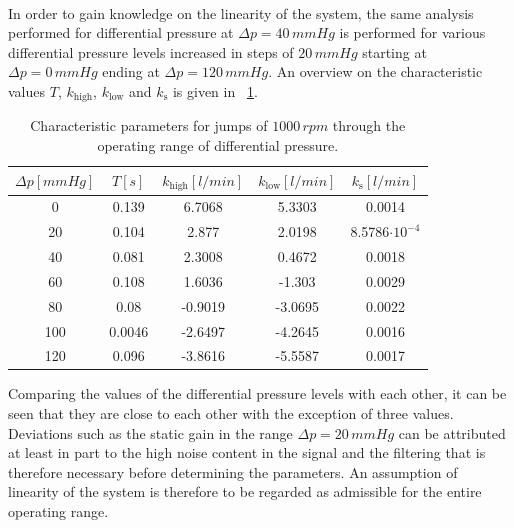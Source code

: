 \\In order to gain knowledge on the linearity of the system, the same analysis performed for differential pressure at $\Delta{p}=40\,mmHg$ is performed for various differential pressure levels increased in steps of $20\,mmHg$ starting at $\Delta{p}=0\,mmHg$ ending at $\Delta{p}=120\,mmHg$. An overview on the characteristic values $T$, $k_{\mathrm{high}}$, $k_{\mathrm{low}}$ and $k_{\mathrm{s}}$ is given in \tablename~\ref{tab:linearity}.
\begin{table}[h]
  \centering
  \begin{tabular}{c|c|c|c|c}
    \toprule
    $\Delta{p} [mmHg]$  & $T [s]$ & $k_{\mathrm{high}} [l/min]$ & $k_{\mathrm{low}} [l/min]$ & $k_{\mathrm{s}} [l/min]$\\
    \midrule
    0 & 0.139 & 6.7068 & 5.3303 & 0.0014\\
    20 & 0.104 & 2.877 & 2.0198 & 8.5786$\cdot10^{-4}$\\
    40 &  0.081 & 2.3008 & 0.4672 & 0.0018\\
    60 & 0.108 & 1.6036 & -1.303 & 0.0029\\
    80 & 0.08 & -0.9019 & -3.0695 & 0.0022\\
    100 & 0.0046 & -2.6497 & -4.2645 & 0.0016\\
    120 & 0.096 & -3.8616 & -5.5587 & 0.0017\\
    \bottomrule
  \end{tabular}
  \caption[Characteristic parameters for jumps of $1000\,rpm$ through the operating range of differential pressure.]{Characteristic parameters for jumps of $1000\,rpm$ through the operating range of differential pressure.}
\label{tab:linearity}
\end{table}
Comparing the values of the differential pressure levels with each other, it can be seen that they are close to each other with the exception of three values. Deviations such as the static gain in the range $\Delta{p}=20\,mmHg$ can be attributed at least in part to the high noise content in the signal and the filtering that is therefore necessary before determining the parameters. An assumption of linearity of the system is therefore to be regarded as admissible for the entire operating range.

